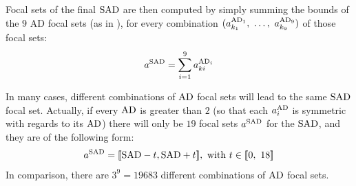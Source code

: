 Focal sets of the final $\mathrm{SAD}$ are then computed by simply summing the bounds of the $9$ AD focal sets (as in ), for every combination $(a^{\mathrm{AD}_1}_{k_1}, ~\dots, ~ a^{\mathrm{AD}_9}_{k_9})$ of those focal sets:
\begin{align}
    a^{\mathrm{SAD}}=\sum_{i=1}^9a^{\mathrm{AD}_i}_{ki}
\end{align}

\begin{remark}
    In many cases, different combinations of $\mathrm{AD}$ focal sets will lead to the same $\mathrm{SAD}$ focal set. Actually, if every $\mathrm{AD}$ is greater than $2$ (so that each $a^{\mathrm{AD}}_i$ is symmetric with regards to its $\mathrm{AD}$) there will only be $19$ focal sets $a^{\mathrm{SAD}}$ for the $\mathrm{SAD}$, and they are of the following form:
    \begin{align}\label{eq:nested_SAD}
        a^{\mathrm{SAD}} = [\![\mathrm{SAD}-t,\mathrm{SAD}+t]\!],\text{ with }t\in[\![0, ~18]\!]
    \end{align}
    In comparison, there are $3^9=19683$ different combinations of $\mathrm{AD}$ focal sets.
\end{remark}

